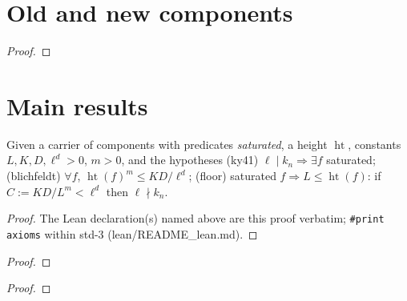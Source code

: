 \chapter{Old and new components}
\begin{lemma}\label{lem:oldnew}

\end{lemma}
\begin{proof}

\end{proof}

\chapter{Main results}
\begin{theorem}\label{thm:Acore}\leanok
Given a carrier of components with predicates \emph{saturated}, a height $\operatorname{ht}$, constants $L,K,D,\ell^d>0$, $m>0$, and the hypotheses (ky41) $\ell\mid k_n\Rightarrow\exists f$ saturated; (blichfeldt) $\forall f$, $\operatorname{ht}(f)^m\le KD/\ell^d$; (floor) saturated $f\Rightarrow L\le\operatorname{ht}(f)$: if $C:=KD/L^m<\ell^d$ then $\ell\nmid k_n$.
\end{theorem}
\begin{proof}\leanok

The Lean declaration(s) named above are this proof verbatim; \texttt{\#print axioms} within std-3 (lean/README\_lean.md).
\end{proof}
\begin{theorem}\label{thm:A}

\end{theorem}
\begin{proof}

\end{proof}
\begin{lemma}\label{lem:D0}

\end{lemma}
\par{}\par
\begin{proof}

\end{proof}
\begin{lemma}\label{lem:D1}

\end{lemma}
